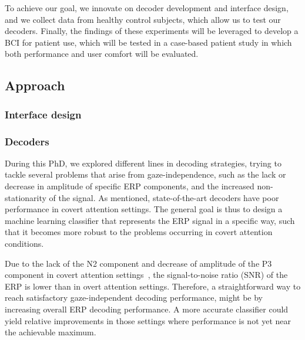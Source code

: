To achieve our goal, we innovate on decoder development and interface design,
and we collect data from healthy control subjects, which allow us to test our decoders.
Finally, the findings of these experiments will be leveraged to develop a BCI
for patient use, which will be tested in a case-based patient study in which
both performance and user comfort will be evaluated.



\subsection{Approach}

\subsubsection{Interface design}



\subsubsection{Decoders}

During this PhD, we explored different lines in decoding strategies,
trying to tackle several problems that arise from gaze-independence, such as
the lack or decrease in amplitude of specific ERP components, and the increased
non-stationarity of the signal.
As mentioned, state-of-the-art decoders have poor performance in covert attention
settings.
The general goal is thus to design a machine learning classifier that represents
the ERP signal in a specific way, such that it becomes more robust to the problems
occurring in covert attention conditions.


Due to the lack of the N2 component and decrease of amplitude of the
P3 component in covert attention
settings~\cite{Treder2010}, the signal-to-noise ratio (SNR) of
the ERP is lower than in overt attention settings.
Therefore, a straightforward way to reach satisfactory
gaze-independent decoding performance, might be by increasing overall ERP
decoding performance. A more accurate classifier could yield relative
improvements in those settings where performance is not yet near the achievable
maximum.

